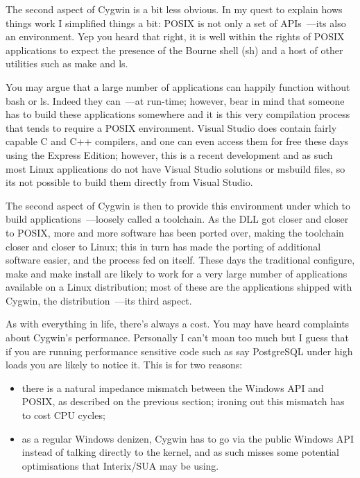 \documentclass{book}
\begin{document}
The second aspect of Cygwin is a bit less obvious. In my quest to
explain hows things work I simplified things a bit: POSIX is not only
a set of APIs~---its also an environment. Yep you heard that right, it
is well within the rights of POSIX applications to expect the presence
of the Bourne shell (sh) and a host of other utilities such as make
and ls.

You may argue that a large number of applications can happily function
without bash or ls. Indeed they can~---at run-time; however, bear in
mind that someone has to build these applications somewhere and it is
this very compilation process that tends to require a POSIX
environment. Visual Studio does contain fairly capable C and C++
compilers, and one can even access them for free these days using the
Express Edition; however, this is a recent development and as such
most Linux applications do not have Visual Studio solutions or msbuild
files, so its not possible to build them directly from Visual Studio.

The second aspect of Cygwin is then to provide this environment under
which to build applications~---loosely called a toolchain. As the DLL
got closer and closer to POSIX, more and more software has been ported
over, making the toolchain closer and closer to Linux; this in turn
has made the porting of additional software easier, and the process
fed on itself. These days the traditional configure, make and make
install are likely to work for a very large number of applications
available on a Linux distribution; most of these are the applications
shipped with Cygwin, the distribution~---its third aspect.

As with everything in life, there's always a cost. You may have heard
complaints about Cygwin's performance. Personally I can't moan too
much but I guess that if you are running performance sensitive code
such as say PostgreSQL under high loads you are likely to notice
it. This is for two reasons:

\begin{itemize}
\item there is a natural impedance mismatch between the Windows API
  and POSIX, as described on the previous section; ironing out this
  mismatch has to cost CPU cycles;
\item as a regular Windows denizen, Cygwin has to go via the public
  Windows API instead of talking directly to the kernel, and as such
  misses some potential optimisations that Interix/SUA may be using.
\end{itemize}
\end{document}
